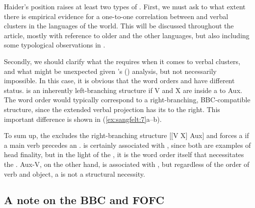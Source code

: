\documentclass[output=paper, colorlinks, citecolor=brown]{langscibook}
\begin{document}
\ea
\label{ex:sangfelt:6}
 \label{ex:sangfelt:6a}
 \label{ex:sangfelt:6b}
\z
\z 


 Haider’s position raises at least two types of . First, we must ask to what extent there is empirical evidence for a one-to-one correlation between  and verbal clusters in the languages of the world. This  will be discussed throughout the article, mostly with reference to older  and the other  languages, but also including some typological observations in .

Secondly, we should clarify what the  requires when it comes to verbal clusters, and what might be unexpected given \citeauthor{Haider2010}’s (\citeyear{Haider2010, Haider2013}) analysis, but not necessarily impossible. In this case, it is obvious that the word orders  and  have different status.  is an inherently left-branching structure if V and X are inside a  to Aux. The word order  would typically correspond to a right-branching, BBC-compatible structure, since the extended verbal projection has its  to the right. This important difference is shown in (\ref{ex:sangfelt:7}a–b).


\ea
\label{ex:sangfelt:7}
\ex{[\textsubscript{VP1} \textit{Aux} [\textsubscript{VP2} \textit{X V}]\label{ex:sangfelt:7b}}
\z 
\z 

To sum up, the  excludes the right-branching structure [[V X] Aux] and forces a  if a main verb precedes an .  is certainly associated with , since both are examples of head finality, but in the light of the , it is the  word order itself that necessitates the . Aux-V, on the other hand, is associated with , but regardless of the order of verb and object, a  is not a structural necessity.

\subsection{A note on the BBC and FOFC}\label{sec:sangfelt:2.2}
\end{document}

